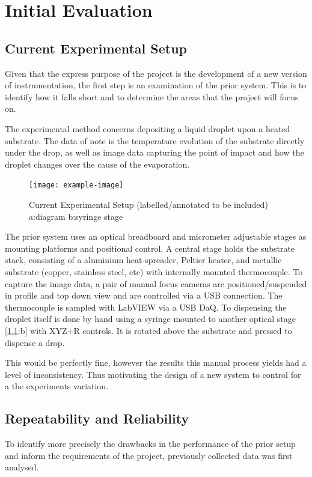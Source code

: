 \chapter{Initial Evaluation}\label{C:init_eval}

\section{Current Experimental Setup}
Given that the express purpose of the project is the development of a new version of instrumentation, the first step is an examination of the prior system. This is to identify how it falls short and to determine the areas that the project will focus on.

The experimental method concerns depositing a liquid droplet upon a heated substrate. The data of note is the temperature evolution of the substrate directly under the drop, as well as image data capturing the point of impact and how the droplet changes over the cause of the evaporation.

\begin{figure}[h]
    \begin{center}
        \texttt{[image: example-image]}
        \caption{Current Experimental Setup (labelled/annotated to be included) a:diagram b:syringe stage}
        \label{fig:prior_exp}
    \end{center}
\end{figure}
The prior system uses an optical breadboard and micrometer adjustable stages as mounting platforms and positional control.
A central stage holds the substrate stack, consisting of a aluminium heat-spreader, Peltier heater, and metallic substrate (copper, stainless steel, etc) with internally mounted thermocouple.
To capture the image data, a pair of manual focus cameras are positioned/suspended in profile and top down view and are controlled via a USB connection. The thermocouple is sampled with LabVIEW via a USB DaQ.
To dispensing the droplet itself is done by hand using a syringe mounted to another optical stage [\ref{fig:prior_exp}:b] with XYZ+R controls. It is rotated above the substrate and pressed to dispense a drop.

This would be perfectly fine, however the results this manual process yields had a level of inconsistency. Thus motivating the design of a new system to control for a the experiments variation.

\newpage
\section{Repeatability and Reliability}
To identify more precisely the drawbacks in the performance of the prior setup and inform the requirements of the project, previously collected data was first analysed.

